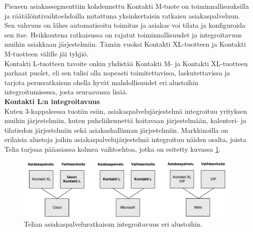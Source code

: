 \documentclass[finnish,12pt,a4paper,pdftex]{article}
\begin{document}
Pieneen asiakassegmenttiin kohdennettu Kontakti M-tuote on toiminnallisuuksilla ja räätälöintivaihtoehdoilla mitattuna yksinkertaisin ratkaisu asiakaspalveluun. Sen vahvuus on lähes automatisoitu toimitus ja asiakas voi tilata ja konfiguroida sen itse. Heikkoutena ratkaisussa on rajatut toiminnallisuudet ja integroitavuus muihin asiakkaan järjestelmiin. Tämän vuoksi Kontakti XL-tuotteen ja Kontakti M-tuotteen välille jäi tyhjiö.\\

Kontakti L-tuotteen tavoite onkin yhdistää Kontakti M- ja Kontakti XL-tuotteen parhaat puolet, eli sen tulisi olla nopeasti toimitettavissa, laskutettavissa ja tarjota perusratkaisun ohella hyvät mahdollisuudet eri alustoihin integroitumisessa, josta seuraavassa lisää.\\

\textbf{Kontakti L:n integroitavuus}\\

Kuten 3-kappaleessa tuotiin esiin, asiakaspalvelujärjestelmä integroituu yrityksen muihin järjestelmiin, kuten puheliikennettä hoitavaan järjestelmään, kalenteri- ja tilatiedon järjestelmiin sekä asiakashallinnan järjestelmiin. Markkinoilla on erilaisia alustoja joihin asiakaspalvelujärjestelmä integroituu näiden osalta, joista Telia tarjoaa pääasiassa kolmea vaihtoehtoa, jotka on esitetty kuvassa \ref{fig:palvelumal}.\\

\begin{figure}[!h]
    \centering
    \includegraphics[scale=0.5]{images/palvelumalli.pdf}
    \caption{Telian asiakaspalveluratkaisun integroitavuus eri alustoihin.}
    \label{fig:palvelumal}
\end{figure}


\end{document}
